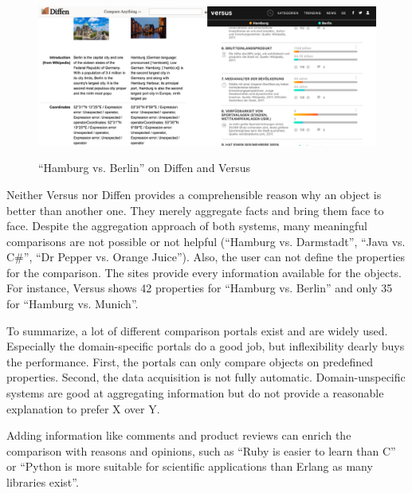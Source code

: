 \begin{figure}[h]
\includegraphics[width=1\textwidth]{images/ds-sys/diffversus}
\label{img:diffversus}
\caption{\enquote{Hamburg vs. Berlin} on Diffen and Versus}
\end{figure}

Neither Versus nor Diffen provides a comprehensible reason why an object is better than another one. They merely aggregate facts and bring them face to face. Despite the aggregation approach of both systems, many meaningful comparisons are not possible or not helpful (\enquote{Hamburg vs. Darmstadt}, \enquote{Java vs. C\#}, \enquote{Dr Pepper vs. Orange Juice}).
Also, the user can not define the properties for the comparison. The sites provide every information available for the objects. For instance, Versus shows 42 properties for \enquote{Hamburg vs. Berlin} and only 35 for \enquote{Hamburg vs. Munich}.
\newline

To summarize, a lot of different comparison portals exist and are widely used. Especially the domain-specific portals do a good job, but inflexibility dearly buys the performance. First, the portals can only compare objects on predefined properties. Second, the data acquisition is not fully automatic. Domain-unspecific systems are good at aggregating information but do not provide a reasonable explanation to prefer X over Y.

Adding information like comments and product reviews can enrich the comparison with reasons and opinions, such as \enquote{Ruby is easier to learn than C} or \enquote{Python is more suitable for scientific applications than Erlang as many libraries exist}.